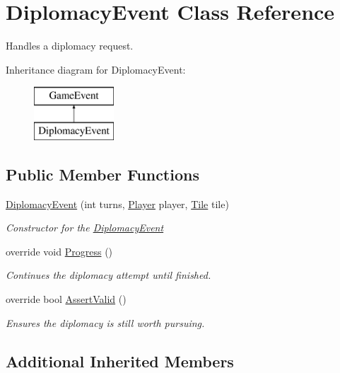 \hypertarget{class_diplomacy_event}{}\section{Diplomacy\+Event Class Reference}
\label{class_diplomacy_event}


Handles a diplomacy request.  


Inheritance diagram for Diplomacy\+Event\+:\begin{figure}[H]
\begin{center}
\leavevmode
\includegraphics[height=2.000000cm]{class_diplomacy_event}
\end{center}
\end{figure}
\subsection*{Public Member Functions}
\begin{DoxyCompactItemize}
\item 
\hyperlink{class_diplomacy_event_a9f240f8309a0991b93f65a207d160246}{Diplomacy\+Event} (int turns, \hyperlink{class_player}{Player} player, \hyperlink{class_tile}{Tile} tile)
\begin{DoxyCompactList}\small\item\em Constructor for the \hyperlink{class_diplomacy_event}{Diplomacy\+Event} \end{DoxyCompactList}\item 
override void \hyperlink{class_diplomacy_event_a0ba4ef9fe3725fc078b7585646331d94}{Progress} ()
\begin{DoxyCompactList}\small\item\em Continues the diplomacy attempt until finished. \end{DoxyCompactList}\item 
override bool \hyperlink{class_diplomacy_event_a163c0891b4fa3389c5c51e8b6a762726}{Assert\+Valid} ()
\begin{DoxyCompactList}\small\item\em Ensures the diplomacy is still worth pursuing. \end{DoxyCompactList}\end{DoxyCompactItemize}
\subsection*{Additional Inherited Members}


